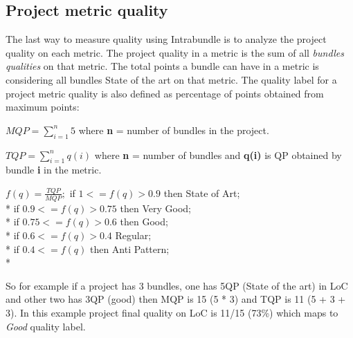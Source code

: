 \subsection{Project metric quality}
\label{sec:project-quality-metric}
The last way to measure quality using Intrabundle is to analyze the project quality on each metric. The project quality in a metric is the sum of all \emph{bundles qualities} on that metric. The total points a bundle can have in a metric is considering all bundles State of the art on that metric. The quality label for a project metric quality is also defined as percentage of points obtained from maximum points:

\(MQP = \sum_{i=1}^{n} 5 \) where \textbf{n} = number of bundles in the project. \newline

\(TQP = \sum_{i=1}^{n} q(i) \) where \textbf{n} = number of bundles and \textbf{q(i)} is QP obtained by bundle \textbf{i} in the metric. \newline

 
\(
f(q) = \frac{TQP}{MQP};
\)
\newline
\newline
 if \( 1 <= f(q) > 0.9 \) then State of Art; \\*
 if \( 0.9 <= f(q) > 0.75 \) then Very Good; \\*
 if \( 0.75 <= f(q) > 0.6 \) then Good; \\*
 if \( 0.6 <= f(q) > 0.4 \) Regular; \\*
 if \( 0.4 <= f(q) \) then Anti Pattern;\\*

So for example if a project has 3 bundles, one has 5QP (State of the art) in LoC and other two has 3QP (good) then MQP is 15 (5 * 3) and TQP is 11 (5 + 3 + 3). In this example project final quality on LoC is 11/15 (73\%) which maps to \emph{Good} quality label.  


